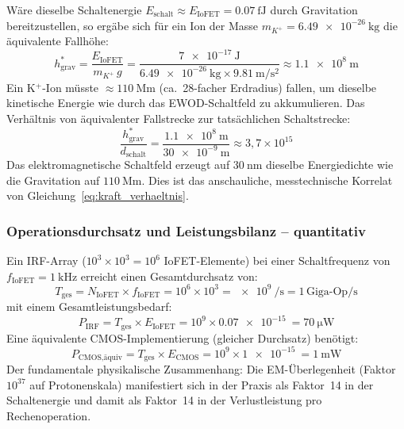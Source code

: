 ﻿\documentclass[12pt, a4paper]{report}
\theoremstyle{definition}
\theoremstyle{remark}
\begin{document}
Wäre dieselbe Schaltenergie
$E_\text{schalt} \approx E_\text{IoFET} = \SI{0.07}{\femto\joule}$
durch Gravitation bereitzustellen, so ergäbe sich für ein Ion der Masse
$m_{K^+} = \SI{6.49e-26}{\kilogram}$ die äquivalente Fallhöhe:
\begin{equation}
  h_\text{grav}^*
  = \frac{E_\text{IoFET}}{m_{K^+}\, g}
  = \frac{\SI{7e-17}{\joule}}%
         {\SI{6.49e-26}{\kilogram} \times \SI{9.81}{\metre\per\second\squared}}
  \approx \SI{1.1e8}{\metre}
  \label{eq:h_grav_aequiv}
\end{equation}
Ein K$^+$-Ion müsste $\approx\SI{110}{\mega\metre}$
(ca.\ 28-facher Erdradius) fallen, um dieselbe kinetische Energie wie durch
das EWOD-Schaltfeld zu akkumulieren. Das Verhältnis von äquivalenter
Fallstrecke zur tatsächlichen Schaltstrecke:
\begin{equation}
  \frac{h_\text{grav}^*}{d_\text{schalt}}
  = \frac{\SI{1.1e8}{\metre}}{\SI{30e-9}{\metre}}
  \approx 3{,}7 \times 10^{15}
  \label{eq:h_ratio}
\end{equation}
Das elektromagnetische Schaltfeld erzeugt auf $\SI{30}{\nano\metre}$
dieselbe Energiedichte wie die Gravitation auf $\SI{110}{\mega\metre}$.
Dies ist das anschauliche, messtechnische Korrelat von
Gleichung~\eqref{eq:kraft_verhaeltnis}.

\subsubsection{Operationsdurchsatz und Leistungsbilanz -- quantitativ}

Ein IRF-Array ($10^3 \times 10^3 = 10^6$ IoFET-Elemente) bei einer
Schaltfrequenz von $f_\text{IoFET} = \SI{1}{\kilo\hertz}$ erreicht einen
Gesamtdurchsatz von:
\begin{equation}
  T_\text{ges}
  = N_\text{IoFET} \times f_\text{IoFET}
  = 10^6 \times 10^3
  = \SI{e9}{\per\second}
  = 1\,\text{Giga-Op/s}
  \label{eq:throughput_irf}
\end{equation}
mit einem Gesamtleistungsbedarf:
\begin{equation}
  P_\text{IRF}
  = T_\text{ges} \times E_\text{IoFET}
  = 10^9 \times \SI{0.07e-15}{}
  = \SI{70}{\micro\watt}
  \label{eq:p_irf}
\end{equation}
Eine äquivalente CMOS-Implementierung (gleicher Durchsatz) benötigt:
\begin{equation}
  P_\text{CMOS,äquiv}
  = T_\text{ges} \times E_\text{CMOS}
  = 10^9 \times \SI{1e-15}{}
  = \SI{1}{\milli\watt}
  \label{eq:p_cmos_equiv}
\end{equation}
Der fundamentale physikalische Zusammenhang: Die EM-Überlegenheit
(Faktor $10^{37}$ auf Protonenskala) manifestiert sich in der Praxis als
Faktor~14 in der Schaltenergie und damit als Faktor~14 in der
Verlustleistung pro Rechenoperation.
\end{document}
